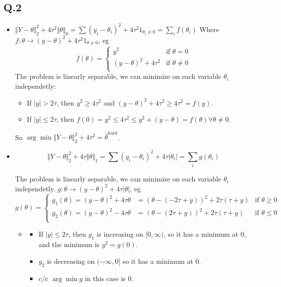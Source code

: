 \documentclass[12pt]{article}\usepackage[]{graphicx}\usepackage[]{color}
\newcommand{\Q}[1]{\subsection*{Q.#1}}
\newenvironment{question}[1]
{\Q{#1}}{}
\begin{document}
\begin{question}{2}
  \begin{itemize}
  \item 
  $\Vert Y - \theta\Vert _2^2 + 4\tau^2 \Vert \theta\Vert _0 = \sum (y_i - \theta_i)^2 + 4\tau^2 1_{\theta_i \ne 0} = \sum_i f(\theta_i)$
  Where $f: \theta \rightarrow (y - \theta)^2 + 4\tau^2 1_{\theta \ne 0}$, eg
  \[
    f(\theta) = \left\{
      \begin{array}{cc}
        y^2 & \text{if } \theta = 0\\
        (y - \theta)^2 + 4 \tau^2& \text{if } \theta \ne 0\\
      \end{array}
    \right.
  \]
  The problem is linearly separable, we can minimize on each variable
  $\theta_i$ independetly:
  \begin{itemize}
  \item If $|y| > 2\tau$, then $y^2 \ge 4\tau^2$ and
    $(y - \theta)^2 + 4\tau^2 \ge 4\tau^2 = f(y)$.
  \item If $|y| \le 2\tau$, then
    $f(0) = y^2 \le 4\tau^2 \le y^2 + (y-\theta) = f(\theta) \forall
    \theta \ne 0$.
  \end{itemize}
  So
  $\arg\min \Vert Y - \theta\Vert _2^2 + 4\tau^2 = \hat
  \theta^{\text{hard}}$.
  
\item 
  $$ \Vert Y - \theta\Vert _2^2 + 4\tau \Vert \theta\Vert _1 = \sum
  (y_i - \theta_i)^2 + 4\tau |\theta_i| = \sum_i g(\theta_i)
  $$

  The problem is linearly separable, we can minimize on each variable
  $\theta_i$ independetly.
  $g: \theta \rightarrow (y - \theta)^2 + 4\tau |\theta|$, eg
  \[
    g(\theta) = \left\{
      \begin{array}{ccc}
        g_1(\theta) = (y - \theta)^2 + 4 \tau \theta&= (\theta - (-2\tau+y) )^2 + 2\tau(\tau+y) & \text{if } \theta \ge 0\\
        g_2(\theta) = (y - \theta)^2 - 4 \tau \theta&= (\theta - (2\tau+y) )^2 + 2\tau(\tau+y)  & \text{if } \theta \le 0\\
      \end{array}
    \right.
  \]



  \begin{itemize}
  \item
    \begin{itemize}
    \item If $|y| \le 2\tau$, then $g_1$ is increasing on  $[0, \infty)$, so it has a minimum at $0$, and the minimum is   $y^2 = g(0)$.
    \item   $g_2$ is decreasing on $(-\infty, 0]$ so it has a  minimum at 0.
    \item   c/c $\arg\min g$ in this case is 0.
    \end{itemize}


\end{itemize}
\end{itemize}
\end{question}
\end{document}
